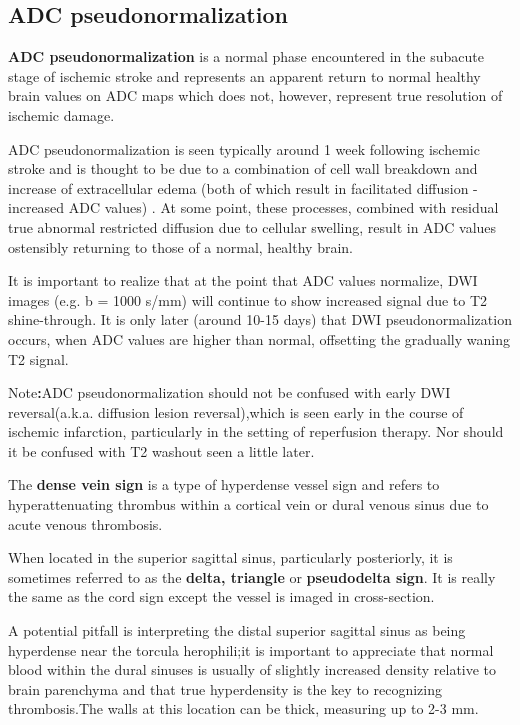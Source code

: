 \subsection{ADC pseudonormalization}

\textbf{ADC pseudonormalization} is a normal phase encountered in the subacute stage of ischemic stroke and represents an apparent return to normal healthy brain values on ADC maps which does not, however, represent true resolution of ischemic damage.

ADC pseudonormalization is seen typically around 1 week following ischemic stroke and is thought to be due to a combination of cell wall breakdown and increase of extracellular edema (both of which result in facilitated diffusion - increased ADC values) . At some point, these processes, combined with residual true abnormal restricted diffusion due to cellular swelling, result in ADC values ostensibly returning to those of a normal, healthy brain.

It is important to realize that at the point that ADC values normalize, DWI images (e.g. b = 1000 s/mm) will continue to show increased signal due to T2 shine-through. It is only later (around 10-15 days) that DWI pseudonormalization occurs, when ADC values are higher than normal, offsetting the gradually waning T2 signal.

Note\textbf{:}ADC pseudonormalization should not be confused with early DWI reversal(a.k.a. diffusion lesion reversal),which is seen early in the course of ischemic infarction, particularly in the setting of reperfusion therapy. Nor should it be confused with T2 washout seen a little later.

\begin{tcolorbox}[colback=blue!5!white,colframe=blue!75!white,title=Dense vein sign]
	
	The \textbf{dense vein sign} is a type of hyperdense vessel sign and refers to hyperattenuating thrombus within a cortical vein or dural venous sinus due to acute venous thrombosis.
	
	When located in the superior sagittal sinus, particularly posteriorly, it is sometimes referred to as the \textbf{delta, triangle} or \textbf{pseudodelta sign}. It is really the same as the cord sign except the vessel is imaged in cross-section.
	
	A potential pitfall is interpreting the distal superior sagittal sinus as being hyperdense near the torcula herophili;it is important to appreciate that normal blood within the dural sinuses is usually of slightly increased density relative to brain parenchyma and that true hyperdensity is the key to recognizing thrombosis.The walls at this location can be thick, measuring up to 2-3 mm.
\end{tcolorbox}

